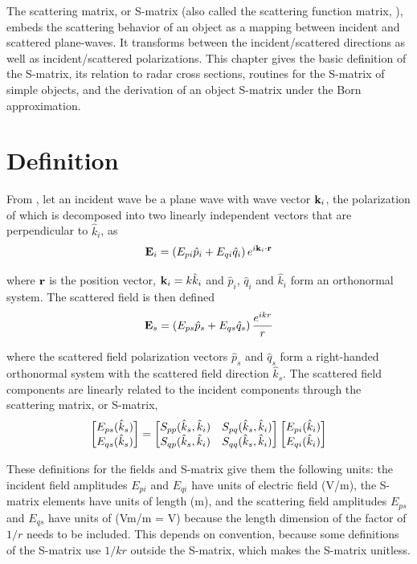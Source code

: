 
The scattering matrix, or S-matrix (also called the scattering function matrix, \cite{tsang2000scattering}), embeds the scattering behavior of an object as a mapping between incident and scattered plane-waves. It transforms between the incident/scattered directions as well as incident/scattered polarizations. This chapter gives the basic definition of the S-matrix, its relation to radar cross sections, routines for the S-matrix of simple objects, and the derivation of an object S-matrix under the Born approximation. 

\section{Definition}

From \cite{tsang2000scattering}, let an incident wave be a plane wave with wave vector $\mathbf{k}_i$, the polarization of which is decomposed into two linearly independent vectors that are perpendicular to $\hat{k}_i$, as
\begin{equation}
\mathbf{E}_i = \left( E_{pi} \hat{p}_i+  E_{qi}\hat{q}_i\right) e^{i\mathbf{k}_i \cdot \mathbf{r}}
\end{equation}

\noindent where $\mathbf{r}$ is the position vector, ${\mathbf{k}}_i = k\hat{{k}}_i$ and $\hat{p}_i$, $\hat{q}_i$ and $\hat{{k}}_i$ form an orthonormal system.  The scattered field is then defined 
\begin{equation}
\mathbf{E}_s = \left( E_{ps}\hat{p}_s +  E_{qs}\hat{q}_s\right) \dfrac{ e^{i k r}}{r}
\end{equation}

\noindent where the scattered field polarization vectors $\hat{p}_s$ and $\hat{q}_s$ form a right-handed orthonormal system with the scattered field direction $\hat{{k}}_s$. The scattered field components are linearly related to the incident components through the scattering matrix, or S-matrix, 
\begin{equation}
\begin{bmatrix} E_{ps}(\hat{k}_s) \\ E_{qs}(\hat{k}_s) \end{bmatrix} = \begin{bmatrix} S_{pp}(\hat{k}_s,\hat{k}_i)    & S_{pq}(\hat{k}_s,\hat{k}_i)  \\ S_{qp}(\hat{k}_s,\hat{k}_i)  & S_{qq}(\hat{k}_s,\hat{k}_i)  \end{bmatrix}   \begin{bmatrix} E_{pi}(\hat{k}_i) \\ E_{qi}(\hat{k}_i) \end{bmatrix} 
\end{equation}
 
These definitions for the fields and S-matrix give them the following units: the incident field amplitudes $E_{pi}$ and $E_{qi}$ have units of electric field (V/m), the S-matrix elements have units of length (m), and the scattering field amplitudes $E_{ps}$ and $E_{qs}$ have units of (Vm/m = V) because the length dimension of the factor of $1/r$ needs to be included. This depends on convention, because some definitions of the S-matrix use $1/kr$ outside the S-matrix, which makes the S-matrix unitless. 

